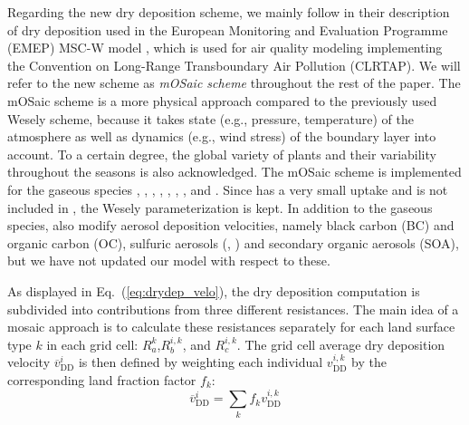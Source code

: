 \documentclass[gmd, manuscript]{copernicus}
\begin{document}
Regarding the new dry deposition scheme, we mainly follow \citet{ACP:Simpson2012} in their description of dry deposition used in the European Monitoring and Evaluation Programme (EMEP) MSC-W model \citep[see also,][]{Emberson2000, WASP:Simpson2003, AE:Tuovinen2004}, which is used for air quality modeling implementing the Convention on Long-Range Transboundary Air Pollution (CLRTAP). We will refer to the new scheme as \emph{mOSaic scheme} throughout the rest of the paper. The mOSaic scheme is a more physical approach compared to the previously used Wesely scheme, because it takes state (e.g., pressure, temperature)  of the atmosphere as well as dynamics (e.g., wind stress) of the boundary layer into account. To a certain degree, the global variety of plants and their variability throughout the seasons is also acknowledged. The mOSaic scheme is implemented for the gaseous species , , , , , , , and . Since  has a very small uptake and is not included in \citet{WASP:Simpson2003,ACP:Simpson2012}, the Wesely parameterization is kept. In addition to the gaseous species, \citet{ACP:Simpson2012} also modify aerosol deposition velocities, namely black carbon (BC) and organic carbon (OC), sulfuric aerosols (, ) and secondary organic aerosols (SOA), but we have not updated our model with respect to these.

As displayed in Eq.~(\ref{eq:drydep_velo}), the dry deposition computation is subdivided into contributions from three different resistances. The main idea of a mosaic approach is to calculate these resistances separately for each land surface type $k$ in each grid cell: $R_a^k$,$R^{i,k}_b$, and $R^{i,k}_c$.
The grid cell average dry deposition velocity $\overline{v}_\mathrm{DD}^{i}$ is then defined by weighting each individual $v_\mathrm{DD}^{i,k}$ by the corresponding land fraction factor $f_k$:
\begin{equation}
  \overline{v}_\mathrm{DD}^{i} = \sum_k{f_k v_\mathrm{DD}^{i,k}}
  \label{eq:ddep_velo_wa}
\end{equation}
\end{document}
